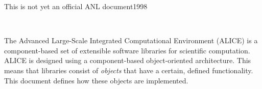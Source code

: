 %
%
%
\setlength{\textwidth}{6.5in}
\setlength{\oddsidemargin}{0.0in}
\setlength{\evensidemargin}{0.0in}
\setlength{\textheight}{9.2in}
\setlength{\topmargin}{-.8in}

\newcommand{\findex}[1]{\index{FUNCTION #1}}
\newcommand{\sindex}[1]{\index{#1}}
\newcommand{\F}{\mbox{\boldmath \(F\)}}
\newcommand{\x}{\mbox{\boldmath \(x\)}}
\newcommand{\rr}{\mbox{\boldmath \(r\)}}

\makeindex
 



{\Large This is not yet an official ANL document}{1998}

\newpage

\hbox{ }

\vspace{1in}
\date{\today}

\newpage



\medskip \medskip


%
%

\medskip \medskip
The Advanced Large-Scale Integrated Computational Environment (ALICE) is 
a component-based set of extensible software libraries for scientific computation.
ALICE is designed using a component-based object-oriented
architecture. This means that libraries consist of {\em objects} that
have a certain, defined functionality. This document defines how these
objects are implemented.

